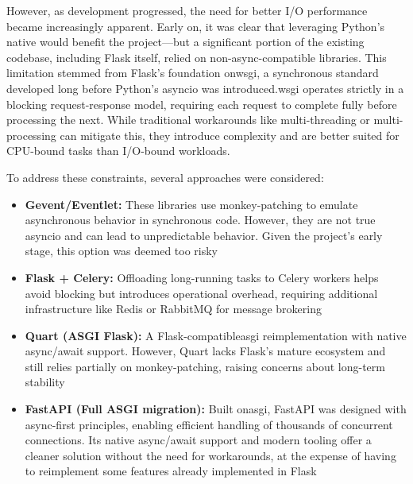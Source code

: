         However, as development progressed, the need for better I/O performance became increasingly apparent. Early on, it was 
        clear that leveraging Python's native  would benefit the project—but a significant portion of the existing codebase, 
        including Flask itself, relied on non-async-compatible libraries. This limitation stemmed from Flask's foundation on\ac{wsgi}, a 
        synchronous standard developed long before Python's asyncio was introduced.\ac{wsgi} operates strictly in a blocking request-response 
        model, requiring each request to complete fully before processing the next. While traditional workarounds like multi-threading 
        or multi-processing can mitigate this, they introduce complexity and are better suited for CPU-bound tasks than I/O-bound workloads.

        To address these constraints, several approaches were considered:

        \begin{itemize}
            \item \textbf{Gevent/Eventlet:} These libraries use monkey-patching to emulate asynchronous behavior in synchronous code. However, 
            they are not true asyncio and can lead to unpredictable behavior. Given the project's early stage, this option was deemed too risky

            \item \textbf{Flask + Celery:} Offloading long-running tasks to Celery workers helps avoid blocking but introduces operational overhead, 
            requiring additional infrastructure like Redis or RabbitMQ for message brokering

            \item \textbf{Quart (ASGI Flask):} A Flask-compatible\ac{asgi} reimplementation with native async/await support. However, Quart lacks 
            Flask's mature ecosystem and still relies partially on monkey-patching, raising concerns about long-term stability

            \item \textbf{FastAPI (Full ASGI migration):} Built on\ac{asgi}, FastAPI was designed with async-first principles, enabling efficient handling 
            of thousands of concurrent connections. Its native async/await support and modern tooling offer a cleaner solution without the need 
            for workarounds, at the expense of having to reimplement some features already implemented in Flask
        \end{itemize}

